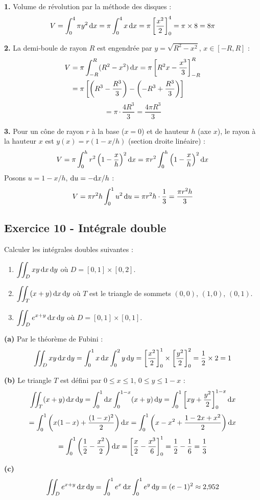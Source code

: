 \documentclass[12pt,a4paper]{article}
\begin{document}
\begin{boitecorrige}
\textbf{1.} Volume de révolution par la méthode des disques :
\[
V = \int_0^4 \pi y^2\,\mathrm{d} x = \pi\int_0^4 x\,\mathrm{d} x = \pi\left[\frac{x^2}{2}\right]_0^4 = \pi\times8 = 8\pi
\]

\textbf{2.} La demi-boule de rayon $R$ est engendrée par $y=\sqrt{R^2-x^2}$, $x\in[-R,R]$ :
\begin{align*}
V &= \pi\int_{-R}^R(R^2-x^2)\,\mathrm{d} x = \pi\left[R^2 x-\frac{x^3}{3}\right]_{-R}^R\\
&= \pi\left[\left(R^3-\frac{R^3}{3}\right)-\left(-R^3+\frac{R^3}{3}\right)\right]
\end{align*}
\[
= \pi\cdot\frac{4R^3}{3} = \frac{4\pi R^3}{3}
\]

\textbf{3.} Pour un cône de rayon $r$ à la base ($x=0$) et de hauteur $h$ (axe $x$), le rayon à la hauteur $x$ est $y(x) = r(1-x/h)$ (section droite linéaire) :
\[
V = \pi\int_0^h r^2\left(1-\frac{x}{h}\right)^2\mathrm{d} x = \pi r^2\int_0^h\left(1-\frac{x}{h}\right)^2\mathrm{d} x
\]
Posons $u = 1-x/h$, $\mathrm{d} u = -\mathrm{d} x/h$ :
\[
V = \pi r^2 h\int_0^1 u^2\,\mathrm{d} u = \pi r^2 h\cdot\frac{1}{3} = \frac{\pi r^2 h}{3}
\]
\end{boitecorrige}

\subsection*{Exercice 10 - Intégrale double \niveau{\difficile}}

\begin{boiteexercice}
Calculer les intégrales doubles suivantes :
\begin{enumerate}[label=(\alph*)]
  \item $\displaystyle\iint_D xy\,\mathrm{d} x\,\mathrm{d} y$ où $D = [0,1]\times[0,2]$.
  \item $\displaystyle\iint_T (x+y)\,\mathrm{d} x\,\mathrm{d} y$ où $T$ est le triangle de sommets $(0,0)$, $(1,0)$, $(0,1)$.
  \item $\displaystyle\iint_D e^{x+y}\,\mathrm{d} x\,\mathrm{d} y$ où $D = [0,1]\times[0,1]$.
\end{enumerate}
\end{boiteexercice}

\begin{boitecorrige}
\textbf{(a)} Par le théorème de Fubini :
\[
\iint_D xy\,\mathrm{d} x\,\mathrm{d} y = \int_0^1 x\,\mathrm{d} x\int_0^2 y\,\mathrm{d} y = \left[\frac{x^2}{2}\right]_0^1\times\left[\frac{y^2}{2}\right]_0^2 = \frac{1}{2}\times2 = 1
\]

\textbf{(b)} Le triangle $T$ est défini par $0\leq x\leq1$, $0\leq y\leq1-x$ :
\[
\iint_T (x+y)\,\mathrm{d} x\,\mathrm{d} y = \int_0^1\mathrm{d} x\int_0^{1-x}(x+y)\,\mathrm{d} y = \int_0^1\left[xy+\frac{y^2}{2}\right]_0^{1-x}\mathrm{d} x
\]
\[
= \int_0^1\left(x(1-x)+\frac{(1-x)^2}{2}\right)\mathrm{d} x = \int_0^1\left(x-x^2+\frac{1-2x+x^2}{2}\right)\mathrm{d} x
\]
\[
= \int_0^1\left(\frac{1}{2}-\frac{x^2}{2}\right)\mathrm{d} x = \left[\frac{x}{2}-\frac{x^3}{6}\right]_0^1 = \frac{1}{2}-\frac{1}{6} = \frac{1}{3}
\]

\textbf{(c)}
\[
\iint_D e^{x+y}\,\mathrm{d} x\,\mathrm{d} y = \int_0^1 e^x\,\mathrm{d} x\int_0^1 e^y\,\mathrm{d} y = (e-1)^2 \approx 2{,}952
\]
\end{boitecorrige}
\end{document}
